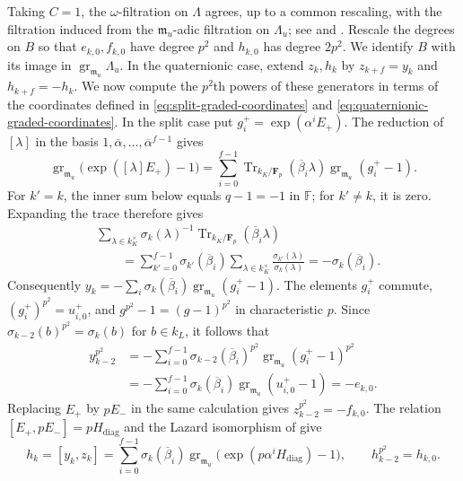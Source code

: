 \documentclass[11pt]{article}
\numberwithin{equation}{section}
\theoremstyle{definition}
\theoremstyle{remark}
\newcommand{\F}{\mathbb F}
\DeclareMathOperator{\gr}{gr}
\begin{document}
Taking $C=1$, the $\omega$-filtration on $\Lambda$ agrees,
up to a common rescaling, with the filtration induced from the
$\mathfrak m_u$-adic filtration on $\Lambda_u$;
see \cite[Prop.~5.3.3]{BHH23} and \cite[Lemma~2.4]{HW24}.
Rescale the degrees on $B$ so that
$e_{k,0},f_{k,0}$ have degree $p^2$ and $h_{k,0}$ has degree $2p^2$.
We identify $B$ with its image in
$\gr_{\mathfrak m_u}\Lambda_u$.
In the quaternionic case, extend $z_k,h_k$ by
$z_{k+f}=y_k$ and $h_{k+f}=-h_k$.
We now compute the $p^2$th powers of these generators in terms
of the coordinates defined in \eqref{eq:split-graded-coordinates}
and \eqref{eq:quaternionic-graded-coordinates}.
In the split case put $g_i^+=\exp(\alpha^iE_+)$.
The reduction of $[\lambda]$ in the basis
$1,\overline\alpha,\ldots,\overline\alpha^{f-1}$ gives
\[
 \gr_{\mathfrak m_u}\bigl(\exp([\lambda]E_+)-1\bigr)
 =\sum_{i=0}^{f-1}
   \operatorname{Tr}_{k_K/\mathbf F_p}(\overline\beta_i\lambda)
                         \gr_{\mathfrak m_u}(g_i^+-1).
\]
For $k'=k$, the inner sum below equals $q-1=-1$ in $\F$;
for $k'\ne k$, it is zero. Expanding the trace therefore gives
\[
 \begin{aligned}
 &\sum_{\lambda\in k_K^\times}\sigma_k(\lambda)^{-1}
              \operatorname{Tr}_{k_K/\mathbf F_p}(\overline\beta_i\lambda)\\
 &\qquad=\sum_{k'=0}^{f-1}\sigma_{k'}(\overline\beta_i)
             \sum_{\lambda\in k_K^\times}
                  \frac{\sigma_{k'}(\lambda)}{\sigma_k(\lambda)}
       =-\sigma_k(\overline\beta_i).
 \end{aligned}
\]
Consequently
$y_k=-\sum_i\sigma_k(\overline\beta_i)\gr_{\mathfrak m_u}(g_i^+-1)$.
The elements $g_i^+$ commute, $(g_i^+)^{p^2}=u^+_{i,0}$,
and $g^{p^2}-1=(g-1)^{p^2}$ in characteristic $p$.
Since $\sigma_{k-2}(b)^{p^2}=\sigma_k(b)$ for $b\in k_L$, it follows that
\[
 \begin{aligned}
 y_{k-2}^{p^2}
 &=-\sum_{i=0}^{f-1}\sigma_{k-2}(\overline\beta_i)^{p^2}
                                  \gr_{\mathfrak m_u}(g_i^+-1)^{p^2}\\
 &=-\sum_{i=0}^{f-1}\sigma_k(\overline\beta_i)
                                  \gr_{\mathfrak m_u}(u^+_{i,0}-1)
   =-e_{k,0}.
 \end{aligned}
\]
Replacing $E_+$ by $pE_-$ in the same calculation gives
$z_{k-2}^{p^2}=-f_{k,0}$.
The relation $[E_+,pE_-]=pH_{\mathrm{diag}}$ and the Lazard
isomorphism of \cite[(43)]{BHH23} give
\[
 h_k=[y_k,z_k]
     =\sum_{i=0}^{f-1}\sigma_k(\overline\beta_i)
              \gr_{\mathfrak m_u}\bigl(\exp(p\alpha^iH_{\mathrm{diag}})-1\bigr),
 \qquad h_{k-2}^{p^2}=h_{k,0}.
\]
\end{document}
